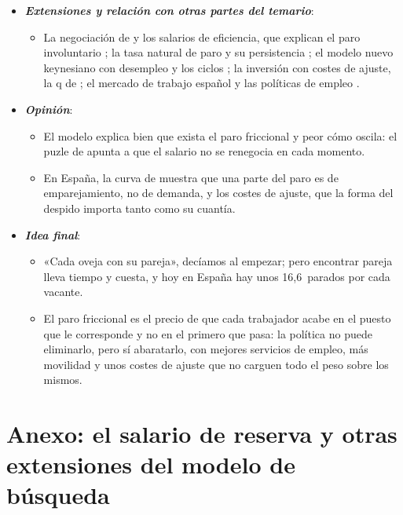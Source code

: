 \documentclass[11pt]{article}
\begin{document}
\begin{itemize}
\begin{itemize}
  \item Son, además, el lenguaje con el que se analizan las prestaciones, las políticas activas y los costes de despido.
  \end{itemize}
\item \textbf{\emph{Extensiones y relación con otras partes del temario}}:
  \begin{itemize}
  \item La negociación de  y los salarios de eficiencia, que explican el paro involuntario ; la tasa natural de paro y su persistencia ; el modelo nuevo keynesiano con desempleo  y los ciclos ; la inversión con costes de ajuste, la q de  ; el mercado de trabajo español y las políticas de empleo .
  \end{itemize}
\item \textbf{\emph{Opinión}}:
  \begin{itemize}
  \item El modelo explica bien que exista el paro friccional y peor cómo oscila: el puzle de  apunta a que el salario no se renegocia en cada momento.

  \item En España, la curva de  muestra que una parte del paro es de emparejamiento, no de demanda, y los costes de ajuste, que la forma del despido importa tanto como su cuantía.
  \end{itemize}
\item \textbf{\emph{Idea final}}:
  \begin{itemize}
  \item «Cada oveja con su pareja», decíamos al empezar; pero encontrar pareja lleva tiempo y cuesta, y hoy en España hay unos 16,6~parados por cada vacante.

  \item El paro friccional es el precio de que cada trabajador acabe en el puesto que le corresponde y no en el primero que pasa: la política no puede eliminarlo, pero sí abaratarlo, con mejores servicios de empleo, más movilidad y unos costes de ajuste que no carguen todo el peso sobre los mismos.
  \end{itemize}
\end{itemize}

\clearpage
\appendix

\section{Anexo: el salario de reserva\cortetitulo{} y otras extensiones del modelo de búsqueda}\label{anexo:busqueda-extensiones}
\end{document}
